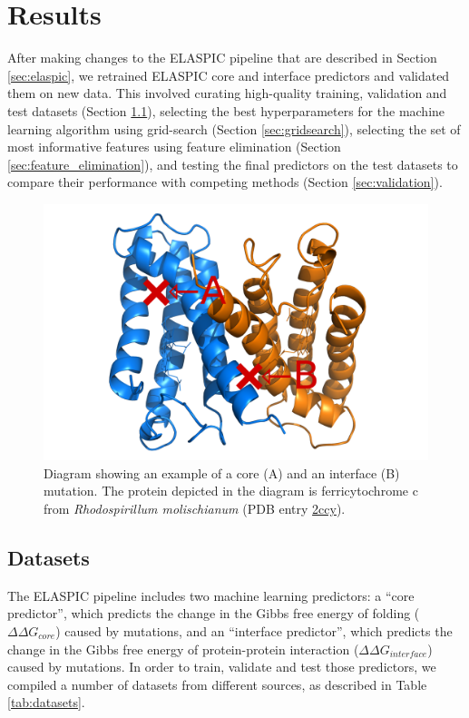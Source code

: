 
\chapter{Results} \label{ch:results}

After making changes to the ELASPIC pipeline that are described in Section \ref{sec:elaspic}, we retrained ELASPIC core and interface predictors and validated them on new data. This involved curating high-quality training, validation and test datasets (Section \ref{sec:datasets}), selecting the best hyperparameters for the machine learning algorithm using grid-search (Section \ref{sec:gridsearch}), selecting the set of most informative features using feature elimination (Section \ref{sec:feature_elimination}), and testing the final predictors on the test datasets to compare their performance with competing methods (Section \ref{sec:validation}).

\begin{figure}[t]
	\centering
	\includegraphics[width=0.8\linewidth]{static/elaspic/core_vs_interface_final.png}
	\caption[Example of a core and interface mutation.]{Diagram showing an example of a core (A) and an interface (B) mutation. The protein depicted in the diagram is ferricytochrome c from \textit{Rhodospirillum molischianum} (PDB entry \url{2ccy}).}
	\label{fig:core_vs_interface}
\end{figure}


\section{Datasets} \label{sec:datasets}

The ELASPIC pipeline includes two machine learning predictors: a ``core predictor'', which predicts the change in the Gibbs free energy of folding ($\Delta \Delta G_{core}$) caused by mutations, and an ``interface predictor'', which predicts the change in the Gibbs free energy of protein-protein interaction ($\Delta \Delta G_{interface}$) caused by mutations. In order to train, validate and test those predictors, we compiled a number of datasets from different sources, as described in Table \ref{tab:datasets}.

